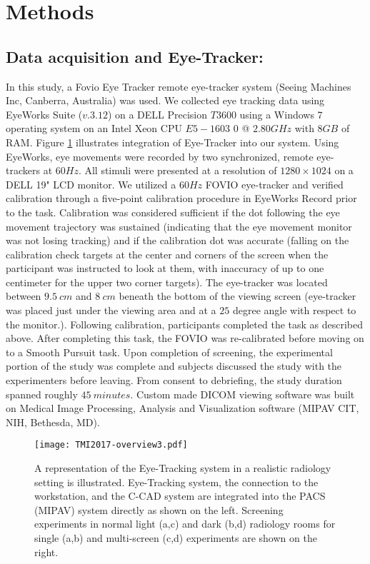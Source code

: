 \documentclass[preprint,12pt]{elsarticle}
\begin{document}
\section{Methods}
\subsection{Data acquisition and Eye-Tracker:}
In this study, a Fovio Eye Tracker  remote eye-tracker system (Seeing Machines Inc, Canberra, Australia) was used. We collected eye tracking data using EyeWorks Suite ($v. 3.12$) on a DELL Precision $T3600$ using a Windows 7 operating system on an Intel Xeon CPU $E5-1603$ 0 @ $2.80 GHz$ with $8 GB$ of RAM. Figure \ref{fig:data} illustrates integration of Eye-Tracker into our system. Using EyeWorks, eye movements were recorded by two synchronized, remote eye-trackers at $60 Hz$. All stimuli were presented at a resolution of $1280\times 1024$ on a DELL 19" LCD monitor. We utilized a $60 Hz$ FOVIO eye-tracker and verified calibration through a five-point calibration procedure in EyeWorks Record prior to the task. Calibration was considered sufficient if the dot following the eye movement trajectory was sustained (indicating that the eye movement monitor was not losing tracking) and if the calibration dot was accurate (falling on the calibration check targets at the center and corners of the screen when the participant was instructed to look at them, with inaccuracy of up to one centimeter for the upper two corner targets). The eye-tracker was located between $9.5\ cm$ and $8\ cm$ beneath the bottom of the viewing screen (eye-tracker was placed just under the viewing area and at a $25$ degree angle with respect to the monitor.). Following calibration, participants completed the task as described above. After completing this task, the FOVIO was re-calibrated before moving on to a Smooth Pursuit task. Upon completion of screening, the experimental portion of the study was complete and subjects discussed the study with the experimenters before leaving. From consent to debriefing, the study duration spanned roughly $45\ minutes$. Custom made DICOM viewing software was built on Medical Image Processing, Analysis and Visualization software (MIPAV CIT, NIH, Bethesda, MD).
\begin{figure}[h]
\centering\texttt{[image: TMI2017-overview3.pdf]}
\caption{A representation of the Eye-Tracking system in a realistic  radiology setting is illustrated. Eye-Tracking system, the connection to the workstation, and the C-CAD system are integrated into the PACS (MIPAV) system directly as shown on the left. Screening experiments in normal light (a,c) and dark (b,d) radiology rooms for single (a,b) and multi-screen (c,d) experiments are shown on the right.\label{fig:data}}
\end{figure}
\end{document}
